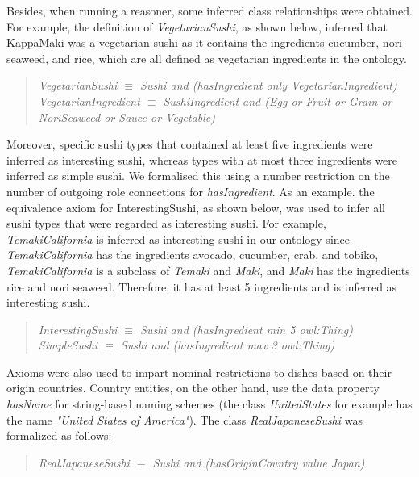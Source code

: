 \documentclass[a4paper]{article}
\theoremstyle{plain}
\theoremstyle{definition}
\begin{document}
Besides, when running a reasoner, some inferred class relationships were obtained. For example, the definition of \textit{VegetarianSushi}, as shown below, inferred that KappaMaki was a vegetarian sushi as it contains the ingredients cucumber, nori seaweed, and rice, which are all defined as vegetarian ingredients in the ontology.

\begin{quote}
    \textit{VegetarianSushi $\equiv$ Sushi and (hasIngredient only VegetarianIngredient)}\\
    \textit{VegetarianIngredient $\equiv$ SushiIngredient and (Egg or Fruit or Grain or NoriSeaweed or Sauce or Vegetable)}
\end{quote}

    
 Moreover, specific sushi types that contained at least five ingredients were inferred as interesting sushi, whereas types with at most three ingredients were inferred as simple sushi. We formalised this using a number restriction on the number of outgoing role connections for \textit{hasIngredient}. As an example. the equivalence axiom for InterestingSushi, as shown below, was used to infer all sushi types that were regarded as interesting sushi. For example, \textit{TemakiCalifornia} is inferred as interesting sushi in our ontology since \textit{TemakiCalifornia} has the ingredients avocado, cucumber, crab, and tobiko, \textit{TemakiCalifornia} is a subclass of \textit{Temaki} and \textit{Maki}, and \textit{Maki} has the ingredients rice and nori seaweed. Therefore, it has at least 5 ingredients and is inferred as interesting sushi.

    \begin{quote}
        \textit{InterestingSushi $\equiv$ Sushi and (hasIngredient min 5 owl:Thing)}\\
        \textit{SimpleSushi $\equiv$ Sushi and (hasIngredient max 3 owl:Thing)}
    \end{quote}

Axioms were also used to impart nominal restrictions to dishes based on their origin countries. Country entities, on the other hand, use the data property \textit{hasName} for string-based naming schemes (the class \textit{UnitedStates} for example has the name \textit{"United States of America"}). The class \textit{RealJapaneseSushi} was formalized as follows:\\
    \begin{quote}
        \textit{RealJapaneseSushi $\equiv$ Sushi and (hasOriginCountry value Japan)}
    \end{quote}
	
\end{document}
